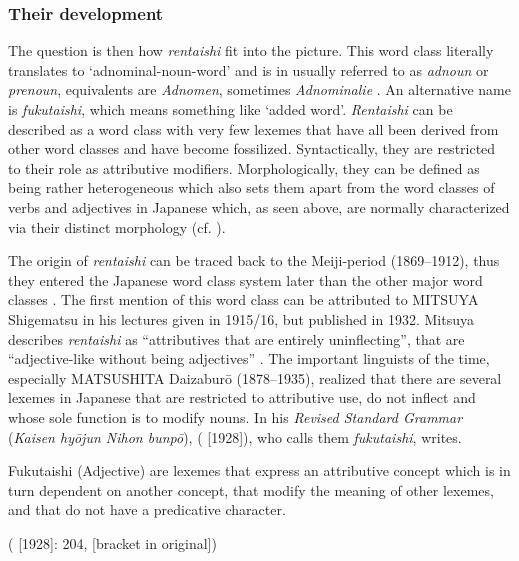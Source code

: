 \documentclass[output=paper,colorlinks,citecolor=brown]{langscibook}
\begin{document}
\subsubsection{Their development} \label{12sec3.3.1}

The question is then how \emph{rentaishi} fit into the picture. This word class literally translates to `adnominal-noun-word' and is in  usually referred to as \emph{adnoun} or \emph{prenoun},  equivalents are \emph{Adnomen}, sometimes \emph{Adnominalie} \citep{rickmeyer1995}. An alternative name is \emph{fukutaishi}, which means something like `added word'. \emph{Rentaishi} can be described as a word class with very few lexemes that have all been derived from other word classes and have become fossilized. Syntactically, they are restricted to their role as attributive modifiers. Morphologically, they can be defined as being rather heterogeneous which also sets them apart from the word classes of verbs and adjectives in Japanese which, as seen above, are normally characterized via their distinct morphology (cf. \citealt{nittamurakishibataniyazawa2000}).

The origin of \emph{rentaishi} can be traced back to the Meiji-period (1869--1912), thus they entered the Japanese word class system later than the other major word classes \citep{frellesvig2010}. The first mention of this word class can be attributed to MITSUYA Shigematsu in his lectures given in 1915/16, but published in 1932. Mitsuya describes \emph{rentaishi} as ``attributives that are entirely uninflecting'', that are ``adjective-like without being adjectives'' \citep[238]{mitsuya1932}. The important linguists of the time, especially MATSUSHITA Daizaburō (1878--1935), realized that there are several lexemes in Japanese that are restricted to attributive use, do not inflect and whose sole function is to modify nouns. In his \emph{Revised Standard Grammar} (\emph{Kaisen hyōjun Nihon bunpō}), \citeauthor{matsushita1976} (\citeyear{matsushita1976} [1928]), who calls them \emph{fukutaishi}, writes.

\begin{exe}
	\ex \label{12ex28}
	Fukutaishi (Adjective) are lexemes that express an attributive concept which is in turn dependent on another concept, that modify the meaning of other lexemes, and that do not have a predicative character.
	
	\hfill (\citeauthor{matsushita1976} \citeyear{matsushita1976} [1928]: 204, [bracket in original])
\end{exe}
\end{document}
